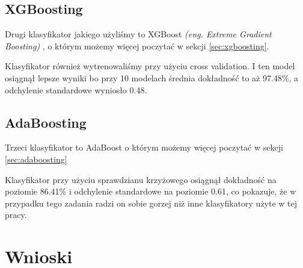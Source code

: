 \documentclass[12pt,a4paper]{article}
\begin{document}
\subsection{XGBoosting}
Drugi klasyfikator jakiego użyliśmy to XGBoost \textit{(eng. Extreme Gradient Boosting)} \cite{xg-boost}, o którym możemy więcej poczytać w sekcji \ref{sec:xgboosting}.

Klasyfikator również wytrenowaliśmy przy użyciu cross validation. I ten model osiągnął lepsze wyniki bo przy 10 modelach średnia dokładność to aż 97.48\%, a odchylenie standardowe wyniosło 0.48. 

\subsection{AdaBoosting}
Trzeci klasyfikator to AdaBoost o którym możemy więcej poczytać w sekcji \ref{sec:adaboosting}

Klasyfikator przy użyciu sprawdzianu krzyżowego osiągnął dokładność na poziomie 86.41\% i odchylenie standardowe na poziomie 0.61, co pokazuje, że w przypadku tego zadania radzi on sobie gorzej niż inne klasyfikatory użyte w tej pracy.

\section{Wnioski}



\end{document}
